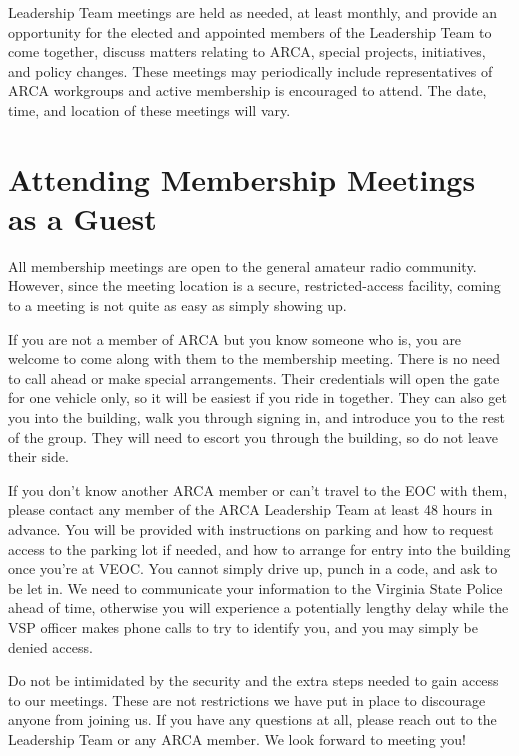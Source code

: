\documentclass[pdflatex,letterpaper,twoside,12pt]{book}
\begin{document}
Leadership Team meetings are held as needed, at least monthly, and provide an opportunity for the elected and appointed members of the Leadership Team to come together, discuss matters relating to ARCA, special projects, initiatives, and policy changes.  These meetings may periodically include representatives of ARCA workgroups and active membership is encouraged to attend.  The date, time, and location of these meetings will vary.


\section{Attending Membership Meetings as a Guest}

All membership meetings are open to the general amateur radio community.  However, since the meeting location is a secure, restricted-access facility, coming to a meeting is not quite as easy as simply showing up.

If you are not a member of ARCA but you know someone who is, you are welcome to come along with them to the membership meeting.  There is no need to call ahead or make special arrangements.  Their credentials will open the gate for one vehicle only, so it will be easiest if you ride in together.  They can also get you into the building, walk you through signing in, and introduce you to the rest of the group.  They will need to escort you through the building, so do not leave their side.

If you don't know another ARCA member or can't travel to the EOC with them, please contact any member of the ARCA Leadership Team at least 48 hours in advance.  You will be provided with instructions on parking and how to request access to the parking lot if needed, and how to arrange for entry into the building once you're at VEOC.  You cannot simply drive up, punch in a code, and ask to be let in.  We need to communicate your information to the Virginia State Police ahead of time, otherwise you will experience a potentially lengthy delay while the VSP officer makes phone calls to try to identify you, and you may simply be denied access.

Do not be intimidated by the security and the extra steps needed to gain access to our meetings.  These are not restrictions we have put in place to discourage anyone from joining us.  If you have any questions at all, please reach out to the Leadership Team or any ARCA member.  We look forward to meeting you!
\end{document}
